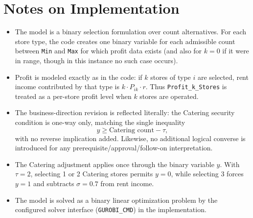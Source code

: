 \section*{Notes on Implementation}

\begin{itemize}
    \item The model is a binary selection formulation over count alternatives. For each store type, the code creates one binary variable for each admissible count between \texttt{Min} and \texttt{Max} for which profit data exists (and also for $k=0$ if it were in range, though in this instance no such case occurs).
    \item Profit is modeled exactly as in the code: if $k$ stores of type $i$ are selected, rent income contributed by that type is $k \cdot P_{ik} \cdot r$. Thus \texttt{Profit\_k\_Stores} is treated as a per-store profit level when $k$ stores are operated.
    \item The business-direction revision is reflected literally: the Catering security condition is one-way only, matching the single inequality
    \[
    y \ge \text{Catering count} - \tau,
    \]
    with no reverse implication added. Likewise, no additional logical converse is introduced for any prerequisite/approval/follow-on interpretation.
    \item The Catering adjustment applies once through the binary variable $y$. With $\tau=2$, selecting 1 or 2 Catering stores permits $y=0$, while selecting 3 forces $y=1$ and subtracts $\sigma=0.7$ from rent income.
    \item The model is solved as a binary linear optimization problem by the configured solver interface (\texttt{GUROBI\_CMD}) in the implementation.
\end{itemize}
